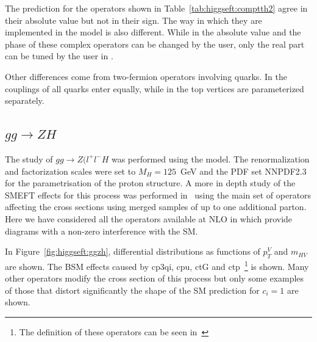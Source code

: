 The prediction for the operators shown in Table~\ref{tab:higgseft:comptth2} agree in their absolute value but not in their sign. The way in which they are implemented in the model is also different. While in \SMEFTsim the absolute value and the phase of these complex operators can be changed by the user, only the real part can be tuned by the user in \SMEFTatNLO.

Other differences come from two-fermion operators involving quarks. In \SMEFTsim the couplings of all quarks enter equally, while in \SMEFTatNLO the top vertices are parameterized separately. 


\subsection{$gg\to ZH$}
\label{sec:higgseft:ggzh}
The study of  $gg\to Z(l^{+}l^{-}H$ was performed using the \SMEFTatNLO model. The renormalization and factorization scales were set to $M_H=125$~GeV and the PDF set NNPDF2.3 for the parametrisation of the proton structure. A more in depth study of the SMEFT effects for this process was performed in~\cite{Bylund:2016phk} using the main set of operators affecting the cross sections using merged samples of up to one additional parton. Here we have considered all the operators available at NLO in \SMEFTatNLO which provide diagrams with a non-zero interference with the SM.

In Figure~\ref{fig:higgseft:ggzh}, differential distributions as functions of $p_{T}^{V}$ and $m_{HV}$ are shown. The BSM effects caused by cp3qi, cpu, ctG and ctp~\footnote{The definition of these operators can be seen in~\cite{SMEFTNLOdefs}} is shown.  Many other operators modify the cross section of this process but only some examples of those that distort significantly the shape of the SM prediction for  $c_i=1$ are shown.

